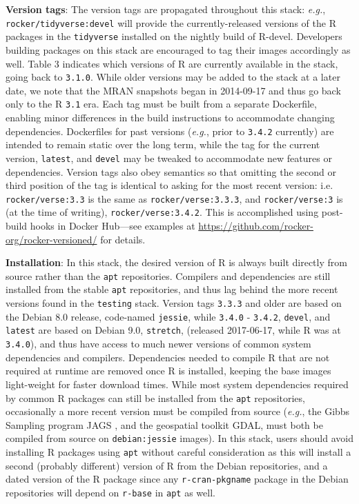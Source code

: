 \textbf{Version tags}: The version tags are propagated throughout this
stack: \emph{e.g.}, \texttt{rocker/tidyverse:devel} will provide the
currently-released versions of the R packages in the \texttt{tidyverse}
\citep{tidyverse} installed on the nightly build of R-devel. Developers
building packages on this stack are encouraged to tag their images
accordingly as well. Table 3 indicates which versions of R are currently
available in the stack, going back to \texttt{3.1.0}. While older
versions may be added to the stack at a later date, we note that the
MRAN snapshots began in 2014-09-17 and thus go back only to the R
\texttt{3.1} era. Each tag must be built from a separate Dockerfile,
enabling minor differences in the build instructions to accommodate
changing dependencies. Dockerfiles for past versions (\emph{e.g.}, prior
to \texttt{3.4.2} currently) are intended to remain static over the long
term, while the tag for the current version, \texttt{latest}, and
\texttt{devel} may be tweaked to accommodate new features or
dependencies. Version tags also obey semantics so that omitting the
second or third position of the tag is identical to asking for the most
recent version: i.e. \texttt{rocker/verse:3.3} is the same as
\texttt{rocker/verse:3.3.3}, and \texttt{rocker/verse:3} is (at the time
of writing), \texttt{rocker/verse:3.4.2}. This is accomplished using
post-build hooks in Docker Hub---see examples at
\url{https://github.com/rocker-org/rocker-versioned/} for details.

\textbf{Installation}: In this stack, the desired version of R is always
built directly from source rather than the \texttt{apt} repositories.
Compilers and dependencies are still installed from the stable
\texttt{apt} repositories, and thus lag behind the more recent versions
found in the \texttt{testing} stack. Version tags \texttt{3.3.3} and
older are based on the Debian 8.0 release, code-named \texttt{jessie},
while \texttt{3.4.0} - \texttt{3.4.2}, \texttt{devel}, and
\texttt{latest} are based on Debian 9.0, \texttt{stretch}, (released
2017-06-17, while R was at \texttt{3.4.0}), and thus have access to much
newer versions of common system dependencies and compilers. Dependencies
needed to compile R that are not required at runtime are removed once R
is installed, keeping the base images light-weight for faster download
times. While most system dependencies required by common R packages can
still be installed from the \texttt{apt} repositories, occasionally a
more recent version must be compiled from source (\emph{e.g.}, the Gibbs
Sampling program JAGS \citep{jags}, and the geospatial toolkit GDAL,
must both be compiled from source on \texttt{debian:jessie} images). In
this stack, users should avoid installing R packages using \texttt{apt}
without careful consideration as this will install a second (probably
different) version of R from the Debian repositories, and a dated
version of the R package since any \texttt{r-cran-pkgname} package in
the Debian repositories will depend on \texttt{r-base} in \texttt{apt}
as well.


